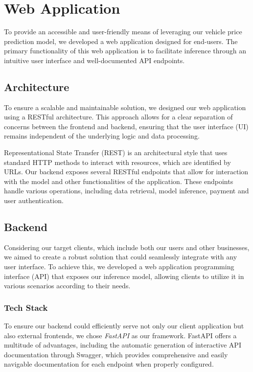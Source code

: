 \chapter{Web Application}
To provide an accessible and user-friendly means of leveraging our vehicle price prediction model, we developed a web application designed for end-users. The primary functionality of this web application is to facilitate inference through an intuitive user interface and well-documented API endpoints.

\section{Architecture}
To ensure a scalable and maintainable solution, we designed our web application using a RESTful architecture. This approach allows for a clear separation of concerns between the frontend and backend, ensuring that the user interface (UI) remains independent of the underlying logic and data processing.

Representational State Transfer (REST) is an architectural style that uses standard HTTP methods to interact with resources, which are identified by URLs. Our backend exposes several RESTful endpoints that allow for interaction with the model and other functionalities of the application. These endpoints handle various operations, including data retrieval, model inference, payment and user authentication.

\section{Backend}
Considering our target clients, which include both our users and other businesses, we aimed to create a robust solution that could seamlessly integrate with any user interface. To achieve this, we developed a web application programming interface (API) that exposes our inference model, allowing clients to utilize it in various scenarios according to their needs.

\subsection{Tech Stack}
To ensure our backend could efficiently serve not only our client application but also external frontends, we chose \textit{FastAPI} \cite{fastapi} as our framework. FastAPI offers a multitude of advantages, including the automatic generation of interactive API documentation through Swagger, which provides comprehensive and easily navigable documentation for each endpoint when properly configured.

